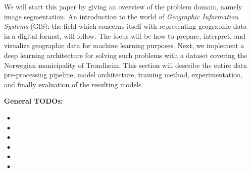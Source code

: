
We will start this paper by giving an overview of the problem domain, namely image segmentation.
An introduction to the world of \textit{Geographic Information Systems} (GIS); the field which concerns itself with representing geographic data in a digital format, will follow.
The focus will be how to prepare, interpret, and visualize geographic data for machine learning purposes.
Next, we implement a deep learning architecture for solving such problems with a dataset covering the Norwegian municipality of Trondheim.
This section will describe the entire data pre-processing pipeline, model architecture, training method, experimentation, and finally evaluation of the resulting models.

\vspace{4em}
\textbf{General TODOs:}
\begin{itemize}
  \item {}
  \item {}
  \item {}
  \item {}
  \item {}
  \item {}
\end{itemize}
